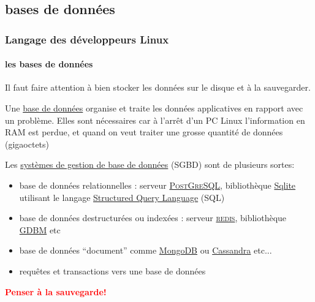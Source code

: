 \documentclass[xcolor=svgnames,final,smaller,a4]{beamer}
\begin{document}
\subsection{bases de données}

\begin{frame}
  \frametitle{Langage des développeurs Linux}
  \framesubtitle{les bases de données}

  Il faut faire attention à bien stocker les données sur le disque et à la sauvegarder. 

  \vspace{0.3cm}
  
  Une \href{https://fr.wikipedia.org/wiki/Base_de_données}{base de
    données} organise et traite les données applicatives en rapport
  avec un problème. Elles sont nécessaires car à l'arrêt d'un PC Linux
  l'information en RAM est perdue, et quand on veut traiter une grosse quantité de données (gigaoctets)

  Les \href{https://fr.wikipedia.org/wiki/Système_de_gestion_de_base_de_données}{systèmes de gestion de base de données} (SGBD) sont de plusieurs sortes:

  \begin{itemize}
  \item base de données relationnelles : serveur
    \href{https://postgresql.org}{\textsc{PostGreSQL}}, bibliothèque
    \href{https://sqlite.org/}{Sqlite} utilisant le langage
    \href{https://fr.wikipedia.org/wiki/Structured_Query_Language}{Structured
      Query Language} (SQL)
  
  \item base de données destructurées ou indexées : serveur
    \href{https://redis.org}{\textsc{redis}}, bibliothèque
    \href{https://www.gnu.org.ua/software/gdbm/}{GDBM} etc

  \item base de données ``document'' comme \href{https://www.mongodb.com}{MongoDB} ou \href{https://cassandra.apache.org/}{Cassandra} etc...

  \item requêtes et transactions vers une base de données
    
  \end{itemize}

\textcolor{red}{\textbf{Penser à la sauvegarde!}}

\end{frame}
\end{document}
